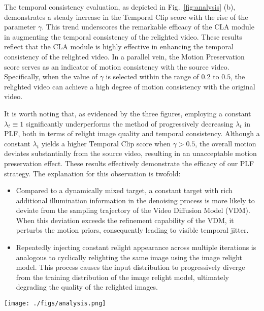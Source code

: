 The temporal consistency evaluation, as depicted in Fig.~\ref{fig:analysis} (b), 
demonstrates a steady increase in the Temporal Clip score with the rise of the parameter $\gamma$.
This trend underscores the remarkable efficacy of the CLA module in augmenting the temporal consistency of the relighted video.
These results reflect that the CLA module is highly effective in enhancing the temporal consistency of the relighted video.
In a parallel vein, the Motion Preservation score serves as an indicator of motion consistency with the source video. 
Specifically, when the value of $\gamma$ is selected within the range of $0.2$ to $0.5$,
the relighted video can achieve a high degree of motion consistency with the original video.

It is worth noting that, as evidenced by the three figures, employing a constant $\lambda_t \equiv 1$ 
significantly underperforms the method of progressively decreasing $\lambda_t$ in PLF, both in terms of 
relight image quality and temporal consistency. Although a constant $\lambda_t$ yields a higher Temporal Clip score when
$\gamma > 0.5$, the overall motion deviates substantially from the source video, resulting in an unacceptable motion preservation effect.
These results effectively demonstrate the efficacy of our PLF strategy.
The explanation for this observation is twofold:
\begin{itemize}
\item Compared to a dynamically mixed target, a constant target with rich additional illumination information 
in the denoising process is more likely to deviate from the sampling trajectory of the Video Diffusion Model (VDM). 
When this deviation exceeds the refinement capability of the VDM, it perturbs the motion priors, consequently leading to visible temporal jitter.

\item Repeatedly injecting constant relight appearance across multiple iterations is analogous to cyclically relighting the same image using the image relight model. 
This process causes the input distribution to progressively diverge from the training distribution of the image relight model, ultimately degrading the quality of the relighted images.
\end{itemize}

\begin{figure*}[htbp]
    \centering
    \texttt{[image: ./figs/analysis.png]}
    \caption{\textbf{The relative effectiveness of different PLF strategy on Light-A-Video performance.}
    (a) FID scores, (b) Temporal CLIP scores, and (c) Motion Preservation scores are shown for four strategies:
    PLF with constant $\lambda$ ($\lambda_t \equiv 1$), and PLF with $k=0.5, 1, 2$.
    Lower FID/Motion Preservation scores and higher Temporal Clip scores indicate better performance.
    }
    \label{fig:analysis}
\end{figure*}


